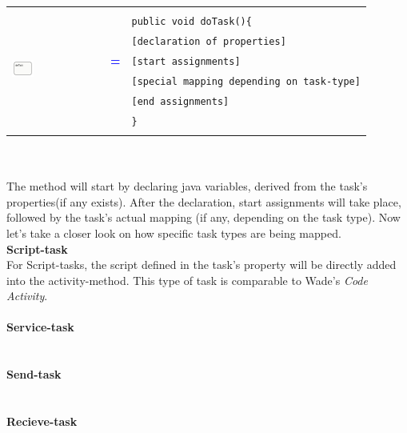 \begin{tabularx}{\linewidth}{lcX}
	\multirow{8}{*}{\includegraphics[width=0.25\textwidth]{images/mapping/task.png}} &  &\\
	& & \texttt{public void doTask()\{}\\
	& & \texttt{\hspace{10pt}[declaration of properties]}\\
	& \textbf{\textcolor{blue}{=}} & \texttt{\hspace{10pt}[start assignments]}\\
	& & \texttt{\hspace{10pt}[special mapping depending on task-type]}\\
	& & \texttt{\hspace{10pt}[end assignments]}\\
	& & \texttt{\}}\\
	& & \\
\end{tabularx}\\\\

The method will start by declaring java variables, derived from the task's properties(if any exists). After the declaration, start assignments will take place, followed by the task's actual mapping (if any, depending on the task type). Now let's take a closer look on how specific task types are being mapped.\\

\textbf{Script-task}\\
For Script-tasks, the script defined in the task's property will be directly added into the activity-method. This type of task is comparable to Wade's \textit{Code Activity}.\\\\

\textbf{Service-task}\\
\\\\

\textbf{Send-task}\\
\\\\

\textbf{Recieve-task}\\
\\\\

